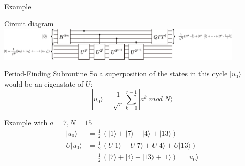 \documentclass{beamer}
\begin{document}
    \begin{frame}{Example}
        \centering
    \end{frame}

    \begin{frame}{Circuit diagram}
        \centering
        \includegraphics[height=1.6cm, keepaspectratio]{images/shor.pdf}
    \end{frame}

    \begin{frame}{Period-Finding Subroutine}
        So a superposition of the states in this cycle $|u_0 \rangle$ would be an
        eigenstate of $U$:
        $$ |u_0\rangle = \frac{1}{\sqrt{r}} \sum_{k=0}^{r-1} |a^k \; mod \; N \rangle$$

        \begin{exampleblock}{Example with $a=7, N=15$}
            \begin{align*}
                |u_0\rangle &= \frac{1}{2} \, (|1\rangle + |7\rangle + |4\rangle + |13\rangle) \\
                U|u_0\rangle &= \frac{1}{2} \, (U|1\rangle + U|7\rangle + U|4\rangle + U|13\rangle) \\
                &= \frac{1}{2} \, (|7\rangle + |4\rangle + |13\rangle + |1\rangle) = |u_0\rangle
            \end{align*}
        \end{exampleblock}
    \end{frame}
\end{document}
